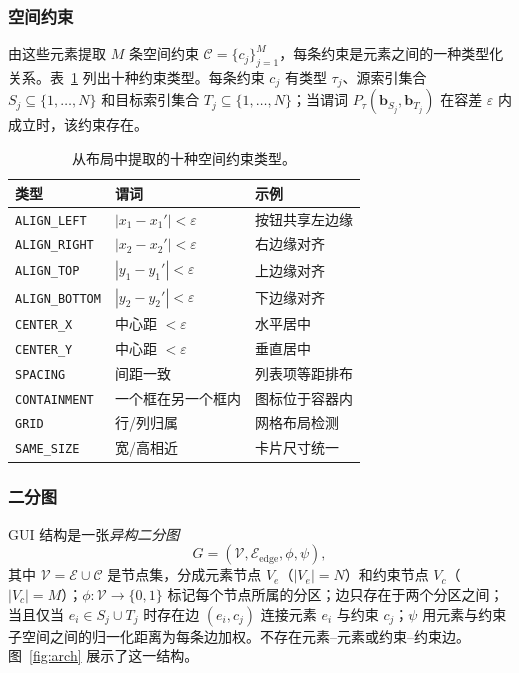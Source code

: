 \documentclass[11pt, letterpaper]{ctexart}
\begin{document}
\subsubsection{空间约束}
由这些元素提取 $M$ 条空间约束
$\mathcal{C}=\{c_j\}_{j=1}^{M}$，每条约束是元素之间的一种类型化关系。表~\ref{tab:constraints} 列出十种约束类型。每条约束 $c_j$ 有类型 $\tau_j$、源索引集合
$S_j\subseteq\{1,\dots,N\}$ 和目标索引集合
$T_j\subseteq\{1,\dots,N\}$；当谓词
$P_\tau(\mathbf{b}_{S_j},\mathbf{b}_{T_j})$ 在容差
$\varepsilon$ 内成立时，该约束存在。

\begin{table}[htbp]
\caption{从布局中提取的十种空间约束类型。}
\label{tab:constraints}
\centering
\begin{tabularx}{\textwidth}{lXX}
\toprule
\textbf{类型} & \textbf{谓词} & \textbf{示例} \\
\midrule
\texttt{ALIGN\_LEFT} & $|x_1-x_1'|<\varepsilon$ & 按钮共享左边缘 \\
\texttt{ALIGN\_RIGHT} & $|x_2-x_2'|<\varepsilon$ & 右边缘对齐 \\
\texttt{ALIGN\_TOP} & $|y_1-y_1'|<\varepsilon$ & 上边缘对齐 \\
\texttt{ALIGN\_BOTTOM} & $|y_2-y_2'|<\varepsilon$ & 下边缘对齐 \\
\texttt{CENTER\_X} & 中心距 $<\varepsilon$ & 水平居中 \\
\texttt{CENTER\_Y} & 中心距 $<\varepsilon$ & 垂直居中 \\
\texttt{SPACING} & 间距一致 & 列表项等距排布 \\
\texttt{CONTAINMENT} & 一个框在另一个框内 & 图标位于容器内 \\
\texttt{GRID} & 行/列归属 & 网格布局检测 \\
\texttt{SAME\_SIZE} & 宽/高相近 & 卡片尺寸统一 \\
\bottomrule
\end{tabularx}
\end{table}

\subsubsection{二分图}
GUI 结构是一张\emph{异构二分图}
\begin{equation}
G=(\mathcal{V},\mathcal{E}_{\text{edge}},\phi,\psi),
\label{eq:graph}
\end{equation}
其中 $\mathcal{V}=\mathcal{E}\cup\mathcal{C}$ 是节点集，分成元素节点 $V_e$（$|V_e|=N$）和约束节点 $V_c$（$|V_c|=M$）；$\phi:\mathcal{V}\to\{0,1\}$ 标记每个节点所属的分区；边只存在于两个分区之间；当且仅当 $e_i\in S_j\cup T_j$ 时存在边 $(e_i,c_j)$ 连接元素 $e_i$ 与约束 $c_j$；$\psi$ 用元素与约束子空间之间的归一化距离为每条边加权。不存在元素--元素或约束--约束边。图~\ref{fig:arch} 展示了这一结构。
\end{document}
